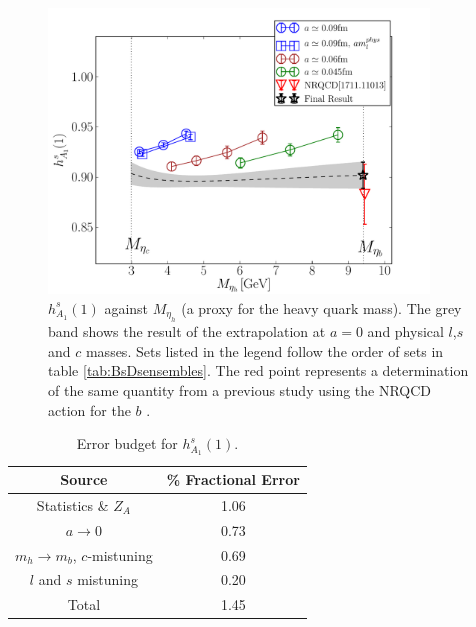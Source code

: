 \begin{figure}[htb!]
  \begin{center}
  \includegraphics[width=0.90\textwidth]{images/BsDsstar/hA1_vsmh.pdf}
  \caption{ $h_{A_1}^s(1)$ against $M_{\eta_h}$ (a proxy for the heavy quark mass). The grey band shows the result of the extrapolation at $a=0$ and physical $l$,$s$ and $c$ masses. Sets listed in the legend follow the order of sets in table \ref{tab:BsDsensembles}. The red point represents a determination of the same quantity from a previous study using the NRQCD action for the $b$ \cite{Harrison:2017fmw}. \label{fig:hA1_vsmetah}}
  \end{center}
\end{figure}

\begin{table}
  \begin{center}
    \begin{tabular}{c c}
      \hline
      Source & \% Fractional Error \\ [0.5ex]
      \hline
      Statistics \& $Z_A$ & 1.06  \\ [1ex]
      $a\to 0$ & 0.73  \\ [1ex]
      $m_h \to m_b$, $c$-mistuning & 0.69 \\ [1ex]
      $l$ and $s$  mistuning & 0.20  \\ [1ex]
      \hline
      Total & 1.45 \\ [1ex]
      \hline
    \end{tabular}
  \end{center}
  \caption{Error budget for $h^s_{A_1}(1)$. \label{tab:errorbudget_BsDsstar}}
\end{table}

